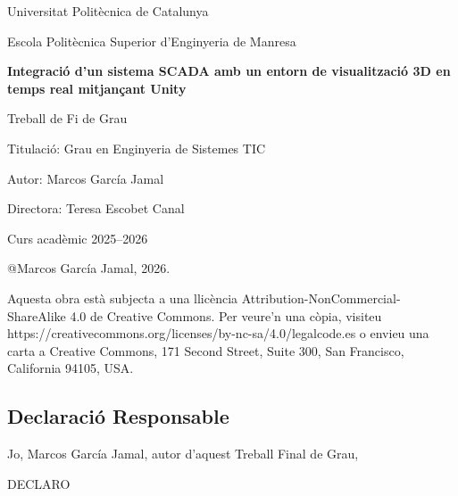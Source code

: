 \documentclass[a4paper,11pt,DIV=13,headings=normal,abstract=true,twoside=semi]{article}
\begin{document}
\begin{titlepage}
    \centering
    {\Large Universitat Politècnica de Catalunya\par}
    \vspace{1cm}
    {\large Escola Politècnica Superior d'Enginyeria de Manresa  \par}
    \vspace{2.5cm}
    {\huge\bfseries Integració d'un sistema SCADA amb un entorn de visualització 3D en temps real mitjançant Unity\par}
    \vspace{2cm}
    {\Large Treball de Fi de Grau\par}
    \vspace{1.5cm}
    {\large Titulació: Grau en Enginyeria de Sistemes TIC\par}
    \vspace{1cm}
    {\large Autor: Marcos García Jamal\par}
    \vspace{0.5cm}
    {\large Directora: Teresa Escobet Canal\par}
    \vfill

    {\large Curs acadèmic 2025--2026\par}
\end{titlepage}

\newpage
\noindent @Marcos García Jamal, 2026.
\bigskip

\noindent Aquesta obra està subjecta a una llicència Attribution-NonCommercial-ShareAlike 4.0 de Creative Commons. Per veure'n una còpia, visiteu https://creativecommons.org/licenses/by-nc-sa/4.0/legalcode.es o envieu una carta a Creative Commons, 171
Second Street, Suite 300, San Francisco, California 94105, USA.
\thispagestyle{empty}

\newpage
\null
\thispagestyle{empty}
\newpage

\begin{center}

    \section*{Declaració Responsable}
\end{center}

    \noindent Jo, Marcos García Jamal, autor d'aquest Treball Final de Grau,

    \noindent DECLARO
\end{document}
